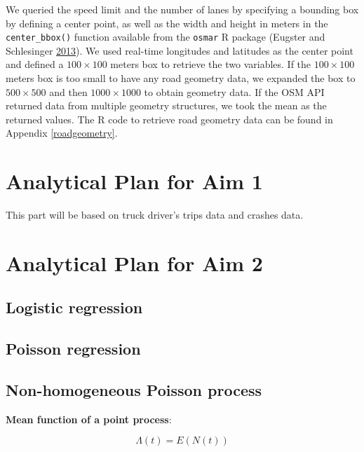\documentclass[12pt]{book}
\numberwithin{equation}{chapter}
\begin{document}
We queried the speed limit and the number of lanes by specifying a bounding box by defining a center point, as well as the width and height in meters in the \texttt{center\_bbox()} function available from the \texttt{osmar} R package (Eugster and Schlesinger \protect\hyperlink{ref-eugster2013osmar}{2013}).
We used real-time longitudes and latitudes as the center point and defined a \(100\times100\) meters box to retrieve the two variables.
If the \(100\times100\) meters box is too small to have any road geometry data, we expanded the box to \(500\times500\) and then \(1000\times1000\) to obtain geometry data.
If the OSM API returned data from multiple geometry structures, we took the mean as the returned values.
The R code to retrieve road geometry data can be found in Appendix \ref{roadgeometry}.

\hypertarget{analytical-plan-for-aim-1}{%
\section{Analytical Plan for Aim 1}\label{analytical-plan-for-aim-1}}

This part will be based on truck driver's trips data and crashes data.

\hypertarget{analytical-plan-for-aim-2}{%
\section{Analytical Plan for Aim 2}\label{analytical-plan-for-aim-2}}

\hypertarget{logistic-regression}{%
\subsection{Logistic regression}\label{logistic-regression}}

\hypertarget{poisson-regression}{%
\subsection{Poisson regression}\label{poisson-regression}}

\hypertarget{non-homogeneous-poisson-process}{%
\subsection{Non-homogeneous Poisson process}\label{non-homogeneous-poisson-process}}

\textbf{Mean function of a point process}:

\[\Lambda(t) = E(N(t))\]
\end{document}
